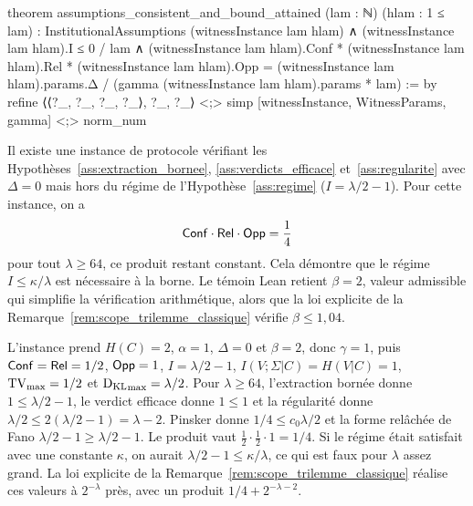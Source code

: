 \begin{sloppypar}
\begin{leancode}[caption={T\'emoin de coh\'erence, instance atteignant la borne}, label={lst:lean4_witness_instance}]
theorem assumptions_consistent_and_bound_attained (lam : ℕ) (hlam : 1 ≤ lam) :
    InstitutionalAssumptions (witnessInstance lam hlam) ∧
    (witnessInstance lam hlam).I ≤ 0 / lam ∧
    (witnessInstance lam hlam).Conf * (witnessInstance lam hlam).Rel *
      (witnessInstance lam hlam).Opp =
      (witnessInstance lam hlam).params.Δ / (gamma (witnessInstance lam hlam).params * lam) := by
  refine ⟨⟨?_, ?_, ?_, ?_⟩, ?_, ?_⟩ <;>
    simp [witnessInstance, WitnessParams, gamma] <;> norm_num
\end{leancode}

\begin{theorem}
\label{thm:scope_necessity}
Il existe une instance de protocole v\'erifiant les Hypoth\`eses~\ref{ass:extraction_bornee}, \ref{ass:verdicts_efficace} et~\ref{ass:regularite}
avec $\Delta = 0$ mais hors du r\'egime de l'Hypoth\`ese~\ref{ass:regime}
($I = \lambda/2 - 1$). Pour cette instance, on a
\begin{equation}
\mathsf{Conf} \cdot \mathsf{Rel} \cdot \mathsf{Opp} = \frac{1}{4}
\end{equation}
pour tout $\lambda \geq 64$, ce produit restant constant. Cela d\'emontre que le r\'egime
$I \leq \kappa/\lambda$ est n\'ecessaire \`a la borne. Le t\'emoin Lean retient
$\beta = 2$, valeur admissible qui simplifie la v\'erification arithm\'etique,
alors que la loi explicite de la Remarque~\ref{rem:scope_trilemme_classique}
v\'erifie $\beta \leq 1{,}04$.
\end{theorem}

\begin{Preuve}
L'instance prend $H(C) = 2$, $\alpha = 1$, $\Delta = 0$ et $\beta = 2$, donc $\gamma = 1$,
puis $\mathsf{Conf} = \mathsf{Rel} = 1/2$, $\mathsf{Opp} = 1$, $I = \lambda/2 - 1$, $I(V;\Sigma|C) = H(V|C) = 1$,
$\operatorname{TV}_{\max} = 1/2$ et $\operatorname{D_{\text{KL}}}_{\max} = \lambda/2$. Pour $\lambda \geq 64$, l'extraction
born\'ee donne $1 \leq \lambda/2 - 1$, le verdict efficace donne $1 \leq 1$ et la
r\'egularit\'e donne $\lambda/2 \leq 2(\lambda/2 - 1) = \lambda - 2$. Pinsker donne
$1/4 \leq c_0\lambda/2$ et la forme rel\^ach\'ee de Fano
$\lambda/2 - 1 \geq \lambda/2 - 1$. Le produit vaut $\tfrac12\cdot\tfrac12\cdot1 = 1/4$.
Si le r\'egime \'etait satisfait avec une constante $\kappa$, on aurait
$\lambda/2 - 1 \leq \kappa/\lambda$, ce qui est faux pour $\lambda$ assez grand. La loi
explicite de la Remarque~\ref{rem:scope_trilemme_classique} r\'ealise ces valeurs
\`a $2^{-\lambda}$ pr\`es, avec un produit $1/4 + 2^{-\lambda-2}$.
\end{Preuve}


\end{sloppypar}
